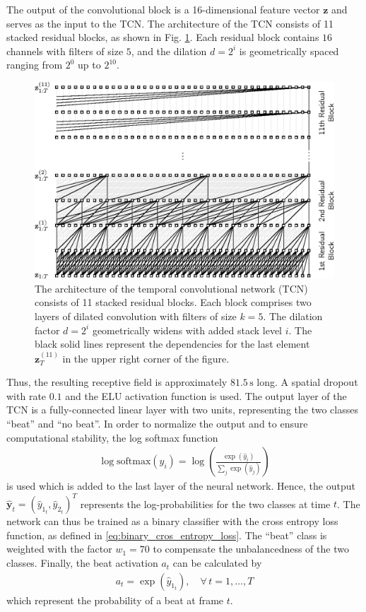 \documentclass{scrartcl}
\begin{document}
The output of the convolutional block is a 16-dimensional feature vector $\mathbf z$ and serves as the input to the TCN. The architecture of the TCN consists of 11 stacked residual blocks, as shown in Fig. \ref{fig:tcn}. Each residual block contains $16$ channels with filters of size $5$, and the dilation $d=2^i$ is geometrically spaced ranging from $2^0$ up to $2^{10}$. 
\begin{figure}[htbp]
\centering
\includegraphics[scale=1.0]{figures/tcn.eps}
\caption{The architecture of the temporal convolutional network (TCN) consists of 11 stacked residual blocks. Each block comprises two layers of dilated convolution with filters of size $k=5$. The dilation factor $d=2^i$ geometrically widens with added stack level $i$. The black solid lines represent the dependencies for the last element $\mathbf z_T^{(11)}$ in the upper right corner of the figure.}
\label{fig:tcn}
\end{figure}    
Thus, the resulting receptive field is approximately $81.5\,\text{s}$ long. A spatial dropout with rate $0.1$ and the ELU activation function is used. The output layer of the TCN is a fully-connected linear layer with two units, representing the two classes ``beat'' and ``no beat''. In order to normalize the output and to ensure computational stability, the log softmax function 
\begin{align}
\log \text{softmax}(\hat{y}_i) = \log\left(\frac{\exp{(\hat{y}_i)}}{\sum_j \exp(\hat{y}_j)}\right)
\end{align} 
is used which is added to the last layer of the neural network. Hence, the output $\hat{\mathbf y}_t = (\hat{y}_{1_t}, \hat{y}_{2_t})^T$ represents the log-probabilities for the two classes at time $t$. The network can thus be trained as a binary classifier with the cross entropy loss function, as defined in \eqref{eq:binary_cros_entropy_loss}. The ``beat'' class is weighted with the factor $w_1=70$ to compensate the unbalancedness of the two classes. Finally, the beat activation $a_t$ can be calculated by
\begin{align}
a_t = \exp \left({\hat{y}_{1_t}} \right), \quad \forall \, t= 1,\dots,T
\end{align}  
which represent the probability of a beat at frame $t$.
\end{document}
